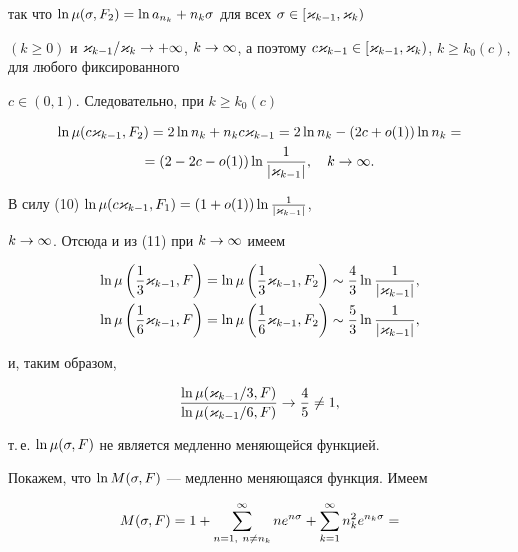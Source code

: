 \begin{pf}
так что $\ln\mu(\sigma,F_2)=\ln a_{n_k}+n_k\sigma$ для всех $\sigma\in[\varkappa_{k-1},\varkappa_k)$


$(k\ge 0)$ и $\k_{k-1}/\k_k\to+\i$, $k\to\i$, а поэтому $c\k_{k-1}\in


[\k_{k-1},\k_k)$, $k\ge k_0(c)$, для любого фиксированного


$c\in(0,1)$. Следовательно, при $k\ge k_0(c)$


\begin{multline}


\ln\mu(c\k_{k-1},F_2)=2\ln n_k+n_kc\k_{k-1}=2\ln


n_k-(2c+o(1))\ln n_k= \\ =


(2-2c-o(1))\ln \frac{1}{|\k_{k-1}|},\quad k\to\i.


\end{multline}


В силу (10) $\ln\mu(c\varkappa_{k-1},F_1)=(1+o(1)) \ln \frac{1}{|\varkappa_{k-1}|}$,


$k\to\infty$. Отсюда и из (11) при $k\to\infty$ имеем


\begin{align*}


\ln\mu\left(\frac13\k_{k-1},F\right)&=


\ln\mu\left(\frac13\k_{k-1},F_2\right)\sim\frac43\ln\frac1{|\k_{k-1}|},\\


\ln\mu\left(\frac16\k_{k-1},F\right)&=


\ln\mu\left(\frac16\k_{k-1},F_2\right)\sim\frac53\ln\frac1{|\k_{k-1}|},


\end{align*}


и, таким образом,


$$


\frac{\ln\mu(\k_{k-1}/3,F)}


{\ln\mu(\k_{k-1}/6,F)}\to\frac45\ne 1,


$$


т.\,е. $\ln\mu(\sigma,F)$ не является медленно меняющейся функцией.





Покажем, что $\ln M(\sigma,F)$ --- медленно меняющаяся функция. Имеем


\begin{multline*}


M(\s,F)=1+\sum_{n=1,\ n\not=n_k}^\i ne^{n\s}+


\sum_{k=1}^\i n_k^2e^{n_k\s}=\\



\end{multline*}
\end{pf}
